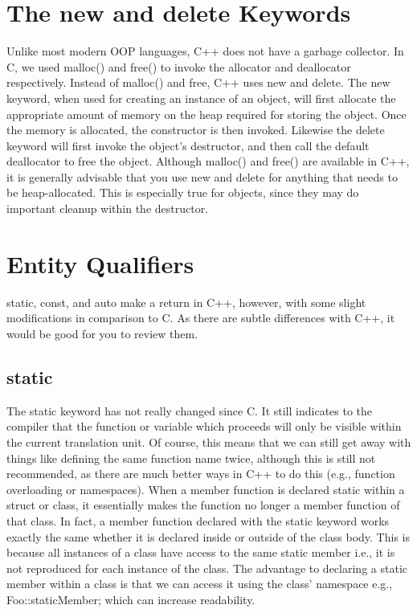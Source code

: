\documentclass{article}
\begin{document}
\section{The new and delete Keywords}

Unlike most modern OOP languages, C++ does not have a garbage collector. In C, we used malloc() and free() to
invoke the allocator and deallocator respectively. Instead of malloc() and free, C++ uses new and delete. The
new keyword, when used for creating an instance of an object, will first allocate the appropriate amount of
memory on the heap required for storing the object. Once the memory is allocated, the constructor is then
invoked. Likewise the delete keyword will first invoke the object's destructor, and then call the default
deallocator to free the object. Although malloc() and free() are available in C++, it is generally advisable
that you use new and delete for anything that needs to be heap-allocated. This is especially true for objects,
since they may do important cleanup within the destructor.

\section{Entity Qualifiers}

static, const, and auto make a return in C++, however, with some slight modifications in comparison to C. As
there are subtle differences with C++, it would be good for you to review them.

\subsection{static}

The static keyword has not really changed since C. It still indicates to the compiler that the function or
variable which proceeds will only be visible within the current translation unit. Of course, this means that
we can still get away with things like defining the same function name twice, although this is still not
recommended, as there are much better ways in C++ to do this (e.g., function overloading or namespaces). When
a member function is declared static within a struct or class, it essentially makes the function no longer a
member function of that class. In fact, a member function declared with the static keyword works exactly the
same whether it is declared inside or outside of the class body. This is because all instances of a class
have access to the same static member i.e., it is not reproduced for each instance of the class. The advantage
to declaring a static member within a class is that we can access it using the class' namespace e.g.,
Foo::staticMember; which can increase readability.
\end{document}
